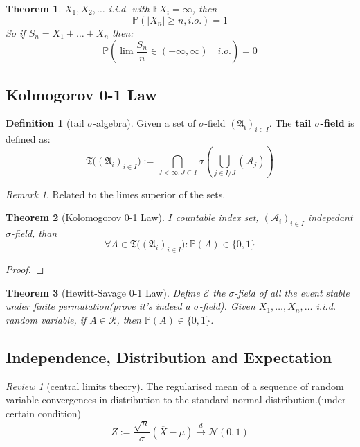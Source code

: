 \documentclass[a4paper,11pt]{book}
\newtheorem{theorem}{Theorem}[section]
\theoremstyle{definition}
\newtheorem{definition}{Definition}[section]
\theoremstyle{remark}
\newtheorem*{remark}{Remark}
\newtheorem{review}{Review}
\begin{document}
\begin{theorem}
	$X_1, X_2, \dots$ i.i.d. with $\mathbb{E} X_i = \infty$, then 
	\begin{equation*}
		\mathbb{P}(|X_n| \geq n, i.o.) = 1
	\end{equation*}
	So if $S_n = X_1 + \dots + X_n$ then:
	\begin{equation*}
		\mathbb{P}(\lim \frac{S_n}{n} \in (-\infty, \infty) \quad i.o.) = 0
	\end{equation*}
\end{theorem}


\subsection{Kolmogorov 0-1 Law}
\begin{definition}[tail $\sigma$-algebra]
Given a set of $\sigma$-field $(\mathfrak{A_i})_{i \in I}$. The \textbf{tail $\sigma$-field} is defined as:
	\begin{equation*}
		\mathfrak{T}\bigg((\mathfrak{A}_i)_{i \in I}\bigg):= \bigcap_{J < \infty, J \subset I}\sigma(\bigcup_{j \in I/J} (\mathcal{A}_j))
	\end{equation*}
\end{definition}
\begin{remark}
Related to the limes superior of the sets.	
\end{remark}


\begin{theorem}[Kolomogorov 0-1 Law]
	$I$ countable index set, $(\mathcal{A}_i)_{i \in I}$ indepedant $\sigma$-field, than
	\begin{equation*}
		\forall A \in \mathfrak{T}\bigg((\mathfrak{A}_i)_{i \in I}\bigg): \mathbb{P}(A) \in \{0, 1\}
	\end{equation*}
\end{theorem}
\begin{proof}
	
\end{proof}

\begin{theorem}[Hewitt-Savage 0-1 Law]
	Define $\mathcal{E}$ the $\sigma$-field of all the event stable under finite permutation(prove it's indeed a $\sigma$-field). Given $X_1, \dots, X_n, \dots$ i.i.d. random variable, if $A \in \mathcal{R}$, then $\mathbb{P}(A) \in \{0, 1\}$.
\end{theorem}


\subsection{Independence, Distribution and Expectation}
\begin{review}[central limits theory]
The regularised mean of a sequence of random variable convergences in distribution to the standard normal distribution.(under certain condition)
\begin{equation}
    Z := \frac{\sqrt{n}}{\sigma}(\overline{X} - \mu) \overset{d}{\longrightarrow}  \mathcal{N} (0, 1)
\end{equation}
\end{review}
\end{document}
